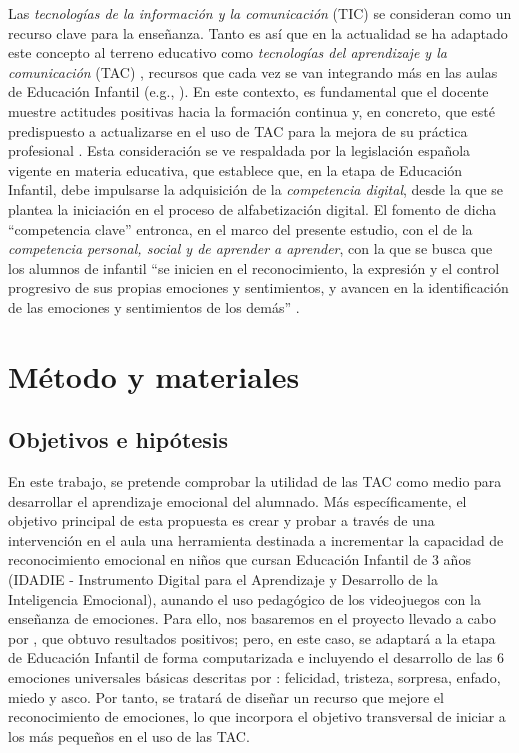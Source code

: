 \documentclass[spanish]{textolivre}
\begin{document}
Las \textit{tecnologías de la información y la comunicación} (TIC) se consideran como un recurso clave para la enseñanza. Tanto es así que en la actualidad se ha adaptado este concepto al terreno educativo como \textit{tecnologías del aprendizaje y la comunicación} (TAC) \cite{velasco_rodriguez_tac_2017}, recursos que cada vez se van integrando más en las aulas de Educación Infantil (e.g., \textcite{aldhilan_incidence_2024,dominguez_nuevos_2017,galvan_patrones_2020,iancu_role_2023,moral_garcia_robotica_2021,moreno_design_2023,urbina_ramirez_editorial:_2021}). En este contexto, es fundamental que el docente muestre actitudes positivas hacia la formación continua y, en concreto, que esté predispuesto a actualizarse en el uso de TAC para la mejora de su práctica profesional \cite{colorado-aguilar_usabilidad_2012}. Esta consideración se ve respaldada por la legislación española vigente en materia educativa, que establece que, en la etapa de Educación Infantil, debe impulsarse la adquisición de la \textit{competencia digital}, desde la que se plantea la iniciación en el proceso de alfabetización digital. El fomento de dicha “competencia clave” entronca, en el marco del presente estudio, con el de la \textit{competencia personal, social y de aprender a aprender}, con la que se busca que los alumnos de infantil “se inicien en el reconocimiento, la expresión y el control progresivo de sus propias emociones y sentimientos, y avancen en la identificación de las emociones y sentimientos de los demás” \cite[p.~14571]{ministerio_de_educacion_y_formacion_profesional_real_2022}.

\section{Método y materiales}\label{sec-normas}
\subsection{Objetivos e hipótesis}
En este trabajo, se pretende comprobar la utilidad de las TAC como medio para desarrollar el aprendizaje emocional del alumnado. Más específicamente, el objetivo principal de esta propuesta es crear y probar a través de una intervención en el aula una herramienta destinada a incrementar la capacidad de reconocimiento emocional en niños que cursan Educación Infantil de 3 años (IDADIE - Instrumento Digital para el Aprendizaje y Desarrollo de la Inteligencia Emocional), aunando el uso pedagógico de los videojuegos con la enseñanza de emociones. Para ello, nos basaremos en el proyecto llevado a cabo por \textcite{ambrona_benito_eficacia_2012}, que obtuvo resultados positivos; pero, en este caso, se adaptará a la etapa de Educación Infantil de forma computarizada e incluyendo el desarrollo de las 6 emociones universales básicas descritas por \textcite{ekman_universal_1970,ekman_que_2003}: felicidad, tristeza, sorpresa, enfado, miedo y asco. Por tanto, se tratará de diseñar un recurso que mejore el reconocimiento de emociones, lo que incorpora el objetivo transversal de iniciar a los más pequeños en el uso de las TAC. 
\end{document}
